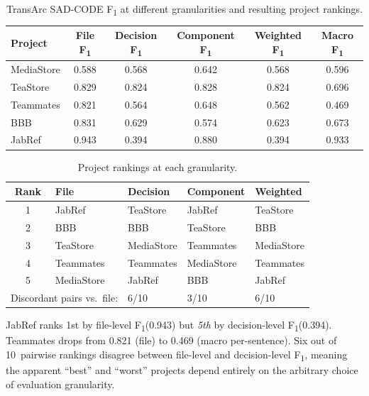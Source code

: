 \documentclass[11pt,a4paper]{report}
\newcommand{\sadcode}{SAD-CODE\xspace}
\newcommand{\transarc}{TransArc\xspace}
\newcommand{\fone}{F\textsubscript{1}\xspace}
\begin{document}
\begin{table}[h]
\caption{\transarc \sadcode \fone at different granularities and resulting
project rankings.}
\label{tab:ranking}
\centering\small
\begin{tabular}{lccccc}
\toprule
\textbf{Project} & \textbf{File \fone} & \textbf{Decision \fone} & \textbf{Component \fone} & \textbf{Weighted \fone} & \textbf{Macro \fone} \\
\midrule
MediaStore  & 0.588 & 0.568 & 0.642 & 0.568 & 0.596 \\
TeaStore    & 0.829 & 0.824 & 0.828 & 0.824 & 0.696 \\
Teammates   & 0.821 & 0.564 & 0.648 & 0.562 & 0.469 \\
BBB         & 0.831 & 0.629 & 0.574 & 0.623 & 0.673 \\
JabRef      & 0.943 & 0.394 & 0.880 & 0.394 & 0.933 \\
\bottomrule
\end{tabular}
\end{table}

\begin{table}[h]
\caption{Project rankings at each granularity.}
\label{tab:ranking_order}
\centering\small
\begin{tabular}{cllll}
\toprule
\textbf{Rank} & \textbf{File} & \textbf{Decision} & \textbf{Component} & \textbf{Weighted} \\
\midrule
1 & JabRef     & TeaStore    & JabRef     & TeaStore \\
2 & BBB        & BBB         & TeaStore   & BBB \\
3 & TeaStore   & MediaStore  & Teammates  & MediaStore \\
4 & Teammates  & Teammates   & MediaStore & Teammates \\
5 & MediaStore & JabRef      & BBB        & JabRef \\
\midrule
\multicolumn{2}{l}{Discordant pairs vs.\ file:} & 6/10 & 3/10 & 6/10 \\
\bottomrule
\end{tabular}
\end{table}

JabRef ranks 1st by file-level \fone (0.943) but \emph{5th} by decision-level
\fone (0.394). Teammates drops from 0.821 (file) to 0.469 (macro per-sentence).
Six out of 10~pairwise rankings disagree between file-level and decision-level
\fone, meaning the apparent ``best'' and ``worst'' projects depend entirely on
the arbitrary choice of evaluation granularity.
\end{document}
